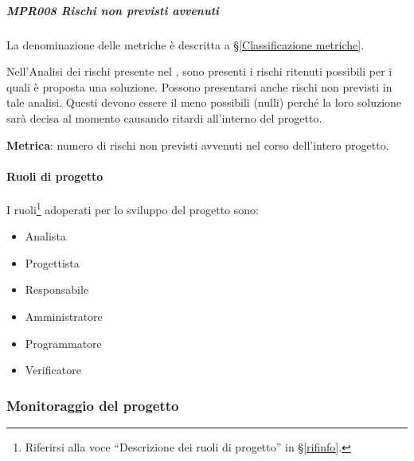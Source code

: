             \subparagraph{MPR008 Rischi non previsti avvenuti}
            La denominazione delle metriche è descritta a \S\ref{Classificazione metriche}.
            
            
            Nell'Analisi dei rischi presente nel \Doc{\PdPv}, sono presenti i rischi ritenuti possibili per i quali è proposta una soluzione.
            Possono presentarsi anche rischi non previsti in tale analisi. Questi devono essere il meno possibili (nulli) perché la loro soluzione sarà decisa al momento causando ritardi all'interno del progetto.
            
            \textbf{Metrica}: numero di rischi non previsti avvenuti nel corso dell'intero progetto.

			\paragraph{Ruoli di progetto}
			I ruoli\footnote{Riferirsi alla voce ``Descrizione dei ruoli di progetto'' in \S\ref{rifinfo}.} adoperati per lo sviluppo del progetto sono:
			\begin{itemize}[noitemsep]
				\item Analista
				\item Progettista
				\item Responsabile
				\item Amministratore
				\item Programmatore
				\item Verificatore
			\end{itemize}


			\subsubsection{Monitoraggio del progetto}


